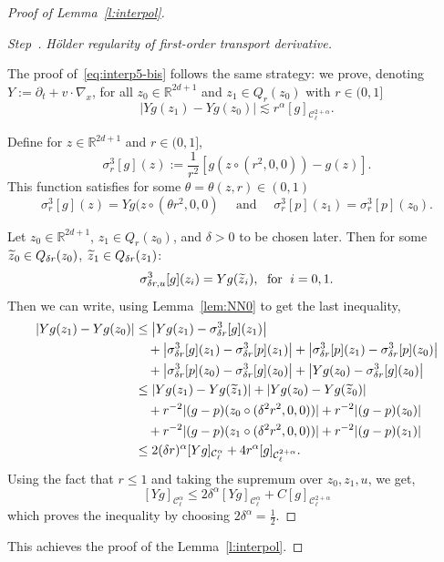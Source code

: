 \documentclass[AHL,Unicode,longabstracts,published]{cedram}
\newcommand{\R}{\mathbb{R}}
\newcommand{\cC}{\mathcal{C}}
\newcounter{stepcount}
\newenvironment{step}[1]{\refstepcounter{stepcount}\begin{proof}[Step~\thestepcount]{\emph{#1}}}{\let\qed\relax\end{proof}}
\let\oldtilde\tilde
\renewcommand*{\tilde}[1]{\mathchoice{\widetilde{#1}}{\widetilde{#1}}{\oldtilde{#1}}{\oldtilde{#1}}}
\begin{document}
\begin{proof}[Proof of Lemma~\ref{l:interpol}]
\begin{step}{H\"older regularity of first-order transport derivative.\label{step5}}

The proof of~\eqref{eq:interp5-bis} follows the same strategy: we prove, denoting $Y:=\partial_t + v \cdot \nabla_x$, for all $z_0 \in \R^{2d+1}$ and $z_1 \in Q_r (z_0)$ with $r \in (0,1]$
\[
\left| Y g (z_1) - Y g (z_0) \right| \lesssim r^\alpha [g]_{\cC_\ell^{2+\alpha}}.
\]

Define for $z \in \R^{2d+1}$ and $r \in (0,1]$,
\[
\sigma^3 _{r}[g](z) := \frac{1}{r^2} \left[g(z \circ (r^2,0,0)) - g(z) \right].
\]
This function satisfies for some $\theta = \theta (z,r) \in (0,1)$
\[
\sigma^3_{r} [g] (z) = Y g (z \circ (\theta r^2,0,0) \quad \text{ and } \quad \sigma_{r}^3[p](z_1) =
\sigma_{r}^3[p](z_0).
\]

Let $z_0 \in \R^{2d+1}$, $z_1 \in Q_r (z_0)$, and $\delta >0$ to be chosen later. Then for some $\tilde z_0 \in Q_{\delta r} (z_0)$, $\tilde z_1 \in Q_{\delta r} (z_1)$:
\[
\sigma_{\delta r,u}^3 [g] (z_i) = Y g (\tilde z_i), \;\text{ for }\; i=0,1.
\]
Then we can write, using Lemma~\ref{lem:NN0} to get the last inequality,
\begin{align*}
\left| Y g(z_1) - Y g(z_0) \right| & \le \left| Y g(z_1) - \sigma _{\delta r}^3[g](z_1) \right|\\
&\quad+ \left| \sigma _{\delta r}^3 [g](z_1) - \sigma _{\delta r}^3 [p](z_1) \right| + \left| \sigma_{\delta r}^3 [p](z_1) - \sigma_{\delta r}^3[p](z_0) \right| \\
& \quad +\left| \sigma_{\delta r}^3[p](z_0) - \sigma_{\delta r}^3 [g](z_0) \right| + \left| Y g(z_0) -\sigma_{\delta r}^3 [g](z_0) \right| \\
& \le \left| Y g(z_1) - Y g (\tilde z_1) \right| +
\left| Y g(z_0) - Yg (\tilde z_0) \right| \\
& \quad + r^{-2} |(g-p) (z_0 \circ (\delta^2 r^2,0,0))| + r^{-2} |(g-p) (z_0)| \\
& \quad + r^{-2} |(g-p) (z_1 \circ (\delta^2 r^2,0,0))| + r^{-2} |(g-p) (z_1)| \\
& \le 2 (\delta r)^\alpha [Y g]_{\cC_\ell^\alpha} + 4 r^{\alpha} [g]_{\cC^{2+\alpha}_\ell}.
\end{align*}
Using the fact that $r \le 1$ and taking the supremum over $z_0,z_1, u$, we get,
\[
[Y g]_{\cC_\ell^\alpha} \le 2 \delta ^\alpha [Yg]_{\cC_\ell^\alpha} + C [g]_{\cC^{2+\alpha}_\ell }
\]
which proves the inequality by choosing $2 \delta^\alpha = \frac{1}{2}$.
\end{step}

This achieves the proof of the Lemma~\ref{l:interpol}.
\end{proof}
\end{document}
